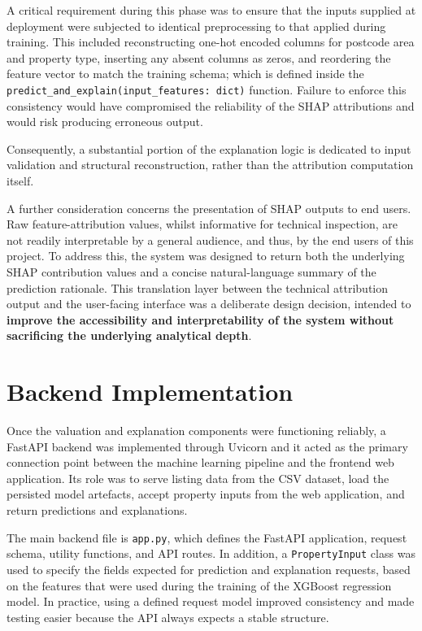 A critical requirement during this phase was to ensure that the inputs supplied at deployment were subjected to identical preprocessing to that applied during training. This included reconstructing one-hot encoded columns for postcode area and property type, inserting any absent columns as zeros, and reordering the feature vector to match the training schema; which is defined inside the \verb|predict_and_explain(input_features: dict)| function. Failure to enforce this consistency would have compromised the reliability of the SHAP attributions and would risk producing erroneous output. 

Consequently, a substantial portion of the explanation logic is dedicated to input validation and structural reconstruction, rather than the attribution computation itself.

A further consideration concerns the presentation of SHAP outputs to end users. Raw feature-attribution values, whilst informative for technical inspection, are not readily interpretable by a general audience, and thus, by the end users of this project. To address this, the system was designed to return both the underlying SHAP contribution values and a concise natural-language summary of the prediction rationale. This translation layer between the technical attribution output and the user-facing interface was a deliberate design decision, intended to \textbf{improve the accessibility and interpretability of the system without sacrificing the underlying analytical depth}.


\section{Backend Implementation}

Once the valuation and explanation components were functioning reliably, a FastAPI backend was implemented through Uvicorn and it acted as the primary connection point between the machine learning pipeline and the frontend web application. Its role was to serve listing data from the CSV dataset, load the persisted model artefacts, accept property inputs from the web application, and return predictions and explanations.

The main backend file is \verb|app.py|, which defines the FastAPI application, request schema, utility functions, and API routes. In addition, a \verb|PropertyInput| class was used to specify the fields expected for prediction and explanation requests, based on the features that were used during the training of the XGBoost regression model. In practice, using a defined request model improved consistency and made testing easier because the API always expects a stable structure.

